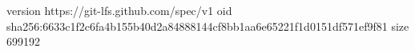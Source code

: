version https://git-lfs.github.com/spec/v1
oid sha256:6633c1f2c6fa4b155b40d2a84888144cf8bb1aa6e65221f1d0151df571ef9f81
size 699192
